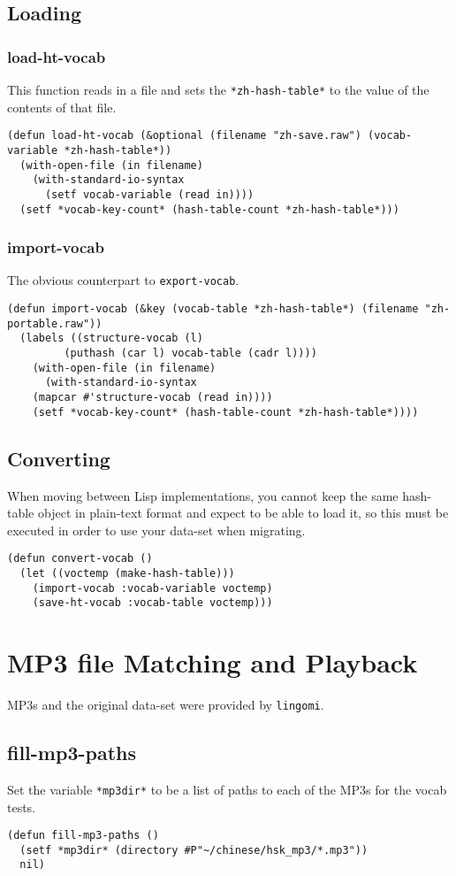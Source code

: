 \documentclass[11pt]{article}
\begin{document}
\subsection{Loading}
\label{sec-6-2}
\subsubsection*{load-ht-vocab}
\label{sec-6-2-1}
This function reads in a file and sets the \texttt{*zh-hash-table*} to the value of the
contents of that file.
\begin{verbatim}
(defun load-ht-vocab (&optional (filename "zh-save.raw") (vocab-variable *zh-hash-table*))
  (with-open-file (in filename)
    (with-standard-io-syntax
      (setf vocab-variable (read in))))
  (setf *vocab-key-count* (hash-table-count *zh-hash-table*)))
\end{verbatim}
\subsubsection*{import-vocab}
\label{sec-6-2-2}
The obvious counterpart to \texttt{export-vocab}.
\begin{verbatim}
(defun import-vocab (&key (vocab-table *zh-hash-table*) (filename "zh-portable.raw"))
  (labels ((structure-vocab (l)
	     (puthash (car l) vocab-table (cadr l))))
    (with-open-file (in filename)
      (with-standard-io-syntax
	(mapcar #'structure-vocab (read in))))
    (setf *vocab-key-count* (hash-table-count *zh-hash-table*))))
\end{verbatim}
\subsection{Converting}
\label{sec-6-3}
When moving between Lisp implementations, you cannot keep the same hash-table
object in plain-text format and expect to be able to load it, so this must be
executed in order to use your data-set when migrating.
\begin{verbatim}
(defun convert-vocab ()
  (let ((voctemp (make-hash-table)))
    (import-vocab :vocab-variable voctemp)
    (save-ht-vocab :vocab-table voctemp)))
\end{verbatim}
\section{MP3 file Matching and Playback}
\label{sec-7}
MP3s and the original data-set were provided by \texttt{lingomi}.

\subsection{fill-mp3-paths}
\label{sec-7-1}
Set the variable \texttt{*mp3dir*} to be a list of paths to each of the MP3s for the
vocab tests.
\begin{verbatim}
(defun fill-mp3-paths ()
  (setf *mp3dir* (directory #P"~/chinese/hsk_mp3/*.mp3"))
  nil)
\end{verbatim}
\end{document}
